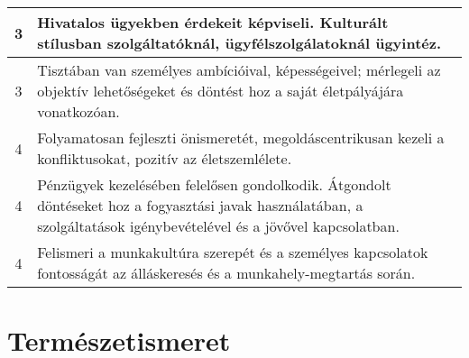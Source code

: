 \begin{longtable}{c | p{12cm} }
                                
                                          3 &  Hivatalos ügyekben érdekeit képviseli. Kulturált stílusban szolgáltatóknál, ügyfélszolgálatoknál ügyintéz. \\ \hline
                                          3 &  Tisztában van személyes ambícióival, képességeivel; mérlegeli az objektív lehetőségeket és döntést hoz a saját életpályájára vonatkozóan. \\ \hline
                                      
                                
                                          4 &  Folyamatosan fejleszti önismeretét, megoldáscentrikusan kezeli a konfliktusokat,  pozitív az életszemlélete. \\ \hline
                                          4 &  Pénzügyek kezelésében felelősen gondolkodik. Átgondolt döntéseket hoz a fogyasztási javak használatában, a szolgáltatások igénybevételével és a jövővel kapcsolatban. \\ \hline
                                          4 &  Felismeri a munkakultúra szerepét és a személyes kapcsolatok fontosságát az álláskeresés és a munkahely-megtartás során. \\ \hline
                                      
                        \end{longtable}
            \clearpage

        \section{Természetismeret}

